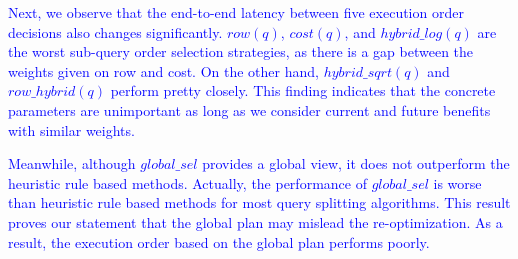 \textcolor{blue}{
    Next, we observe that the end-to-end latency between five execution order decisions also changes significantly. $row(q)$, $cost(q)$, and $hybrid\_log(q)$ are the worst sub-query order selection strategies, as there is a gap between the weights given on row and cost. On the other hand, $hybrid\_sqrt(q)$ and $row\_hybrid(q)$ perform pretty closely. This finding indicates that the concrete parameters are unimportant as long as we consider current and future benefits with similar weights.
}\par
\textcolor{blue}{
    Meanwhile, although $global\_sel$ provides a global view, it does not outperform the heuristic rule based methods. Actually, the performance of $global\_sel$ is worse than heuristic rule based methods for most query splitting algorithms. This result proves our statement that the global plan may mislead the re-optimization. As a result, the execution order based on the global plan performs poorly.
}\par


